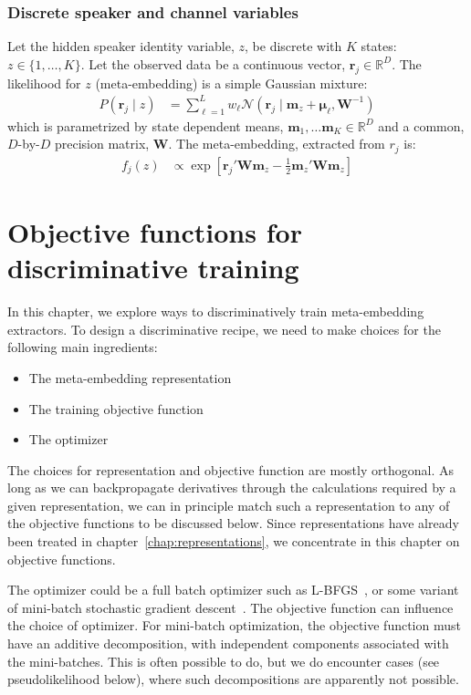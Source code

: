 \documentclass[a4paper,oneside,12pt,english]{report}
\def\ND{\mathcal{N}}
\def\R{\mathbb{R}}
\def\Wmat{\mathbf{W}}
\def\mvec{\mathbf{m}}
\def\rvec{\mathbf{r}}
\def\muvec{\boldsymbol{\mu}}
\begin{document}
\subsection{Discrete speaker and channel variables}
Let the hidden speaker identity variable, $z$, be discrete with $K$ states: $z\in\{1,\ldots,K\}$. Let the observed data be a continuous vector, $\rvec_j\in\R^D$. The likelihood for $z$ (meta-embedding) is a simple Gaussian mixture:
\begin{align}
P(\rvec_j\mid z) &= \sum_{\ell=1}^L w_\ell \ND(\rvec_j\mid\mvec_z + \muvec_\ell,\Wmat^{-1})
\end{align}
which is parametrized by state dependent means, $\mvec_1,\ldots\mvec_K\in\R^D$ and a common, $D$-by-$D$ precision matrix, $\Wmat$. The meta-embedding, extracted from $r_j$ is:
\begin{align}
f_j(z) &\propto \exp[\rvec_j'\Wmat\mvec_z - \frac12 \mvec_z'\Wmat\mvec_z]
\end{align}





\chapter{Objective functions for discriminative training}
\label{chap:discrim}
In this chapter, we explore ways to discriminatively train meta-embedding extractors. To design a discriminative recipe, we need to make choices for the following main ingredients:
\begin{itemize}
	\item The meta-embedding representation
	\item The training objective function
	\item The optimizer
\end{itemize}
The choices for representation and objective function are mostly orthogonal. As long as we can backpropagate derivatives through the calculations required by a given representation, we can in principle match such a representation to any of the objective functions to be discussed below. Since representations have already been treated in chapter~\ref{chap:representations}, we concentrate in this chapter on objective functions. 

The optimizer could be a full batch optimizer such as L-BFGS~\cite{Nocedal}, or some variant of mini-batch stochastic gradient descent~\cite{SGD_review}. The objective function can influence the choice of optimizer. For mini-batch optimization, the objective function must have an additive decomposition, with independent components associated with the mini-batches. This is often possible to do, but we do encounter cases (see pseudolikelihood below), where such decompositions are apparently not possible.
\end{document}
